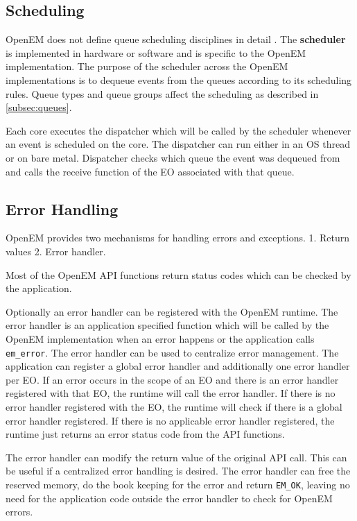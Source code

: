 \subsection{Scheduling}
\label{subsec:schedule}
OpenEM does not define queue scheduling disciplines in detail
\cite{openempage}. The \textbf{scheduler} is implemented in hardware or
software and is specific to the OpenEM implementation. The purpose of the
scheduler across the OpenEM implementations is to dequeue events from the
queues according to its scheduling rules. \cite{openemintro} Queue types and
queue groups affect the scheduling as described in \ref{subsec:queues}.

Each core executes the dispatcher which will be called by the scheduler
whenever an event is scheduled on the core. The dispatcher can run either in an
OS thread or on bare metal. Dispatcher checks which queue the event was
dequeued from and calls the receive function of the EO associated with that
queue. \cite{openemintro}

\subsection{Error Handling}
\label{subsec:error}
OpenEM provides two mechanisms for handling errors and exceptions. 1. Return
values 2. Error handler.

Most of the OpenEM API functions return status codes which can be checked by the
application. \cite{openempage}

Optionally an error handler can be registered with the OpenEM runtime. The error
handler is an application specified function which will be called by the OpenEM
implementation when an error happens or the application calls
\texttt{em\_error}. The error handler can be used to centralize error
management. The application can register a global error handler and additionally
one error handler per EO. If an error occurs in the scope of an EO and there is
an error handler registered with that EO, the runtime will call the error
handler. If there is no error handler registered with the EO, the runtime will
check if there is a global error handler registered. If there is no applicable
error handler registered, the runtime just returns an error status code from the
API functions. \cite{openempage}

The error handler can modify the return value of the original API call. This can
be useful if a centralized error handling is desired. The error handler can free
the reserved memory, do the book keeping for the error and return
\texttt{EM\_OK}, leaving no need for the application code outside the error
handler to check for OpenEM errors. \cite{openempage}
